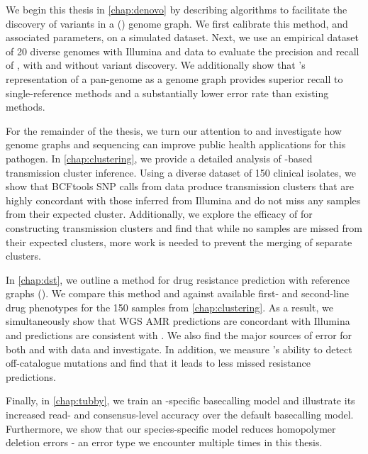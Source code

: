 We begin this thesis in \autoref{chap:denovo} by describing algorithms to facilitate the \denovo{} discovery of variants in a (\pandora{}) genome graph. We first calibrate this method, and associated parameters, on a simulated dataset. Next, we use an empirical dataset of 20 diverse \ecoli{} genomes with Illumina and \ont{} data to evaluate the precision and recall of \pandora{}, with and without \denovo{} variant discovery. We additionally show that \pandora{}'s representation of a pan-genome as a genome graph provides superior recall to single-reference methods and a substantially lower \ont{} error rate than existing methods.

For the remainder of the thesis, we turn our attention to \mtb{} and investigate how genome graphs and \ont{} sequencing can improve public health applications for this pathogen. In \autoref{chap:clustering}, we provide a detailed analysis of \ont{}-based transmission cluster inference. Using a diverse dataset of 150 \mtb{} clinical isolates, we show that BCFtools SNP calls from \ont{} data produce transmission clusters that are highly concordant with those inferred from Illumina and do not miss any samples from their expected cluster. Additionally, we explore the efficacy of \pandora{} for constructing transmission clusters and find that while no samples are missed from their expected clusters, more work is needed to prevent the merging of separate clusters.

In \autoref{chap:dst}, we outline a method for drug resistance prediction with \pandora{} reference graphs (\drprg{}). We compare this method and \mykrobe{} against available first- and second-line drug phenotypes for the 150 samples from \autoref{chap:clustering}. As a result, we simultaneously show that \ont{} WGS AMR predictions are concordant with Illumina and \drprg{} predictions are consistent with \mykrobe{}. We also find the major sources of error for both \mykrobe{} and \drprg{} with \ont{} data and investigate. In addition, we measure \drprg{}'s ability to detect off-catalogue mutations and find that it leads to less missed resistance predictions.

Finally, in \autoref{chap:tubby}, we train an \mtb{}-specific \ont{} basecalling model and illustrate its increased read- and consensus-level accuracy over the default basecalling model. Furthermore, we show that our species-specific model reduces homopolymer deletion errors - an error type we encounter multiple times in this thesis.